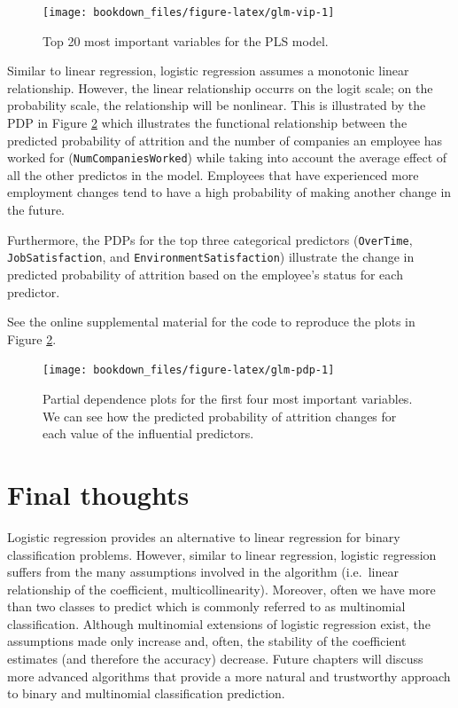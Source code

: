 \documentclass[]{krantz}
\makeatletter
\newenvironment{kframe}{%
\medskip{}
\setlength{\fboxsep}{.8em}
 \def\at@end@of@kframe{}%
 \ifinner\ifhmode%
  \def\at@end@of@kframe{\end{minipage}}%
  \begin{minipage}{\columnwidth}%
 \fi\fi%
 \def\FrameCommand##1{\hskip\@totalleftmargin \hskip-\fboxsep
 \colorbox{shadecolor}{##1}\hskip-\fboxsep
     \hskip-\linewidth \hskip-\@totalleftmargin \hskip\columnwidth}%
 \MakeFramed {\advance\hsize-\width
   \@totalleftmargin\z@ \linewidth\hsize
   \@setminipage}}%
 {\par\unskip\endMakeFramed%
 \at@end@of@kframe}
\newenvironment{block}[1]
  {
  \begin{itemize}
  \renewcommand{\labelitemi}{
    \raisebox{-.7\height}[0pt][0pt]{
      {\setkeys{Gin}{width=3em,keepaspectratio}\texttt{[image: icons/\#1]}}
    }
  }
  \setlength{\fboxsep}{1em}
  \begin{kframe}
  \item
  }
  {
  \end{kframe}
  \end{itemize}
  }
\newenvironment{tip}
  {\begin{block}{tip}}
  {\end{block}}
\makeatother
\begin{document}
\begin{figure}

{\centering \texttt{[image: bookdown\_files/figure-latex/glm-vip-1]} 

}

\caption{Top 20 most important variables for the PLS model.}\label{fig:glm-vip}
\end{figure}

Similar to linear regression, logistic regression assumes a monotonic linear relationship. However, the linear relationship occurrs on the logit scale; on the probability scale, the relationship will be nonlinear. This is illustrated by the PDP in Figure \ref{fig:glm-pdp} which illustrates the functional relationship between the predicted probability of attrition and the number of companies an employee has worked for (\texttt{NumCompaniesWorked}) while taking into account the average effect of all the other predictos in the model. Employees that have experienced more employment changes tend to have a high probability of making another change in the future.

Furthermore, the PDPs for the top three categorical predictors (\texttt{OverTime}, \texttt{JobSatisfaction}, and \texttt{EnvironmentSatisfaction}) illustrate the change in predicted probability of attrition based on the employee's status for each predictor.

\begin{tip}
See the online supplemental material for the code to reproduce the plots
in Figure \ref{fig:glm-pdp}.
\end{tip}

\begin{figure}

{\centering \texttt{[image: bookdown\_files/figure-latex/glm-pdp-1]} 

}

\caption{Partial dependence plots for the first four most important variables.  We can see how the predicted probability of attrition changes for each value of the influential predictors.}\label{fig:glm-pdp}
\end{figure}

\hypertarget{final-thoughts-1}{%
\section{Final thoughts}\label{final-thoughts-1}}

Logistic regression provides an alternative to linear regression for binary classification problems. However, similar to linear regression, logistic regression suffers from the many assumptions involved in the algorithm (i.e.~linear relationship of the coefficient, multicollinearity). Moreover, often we have more than two classes to predict which is commonly referred to as multinomial classification. Although multinomial extensions of logistic regression exist, the assumptions made only increase and, often, the stability of the coefficient estimates (and therefore the accuracy) decrease. Future chapters will discuss more advanced algorithms that provide a more natural and trustworthy approach to binary and multinomial classification prediction.
\end{document}
